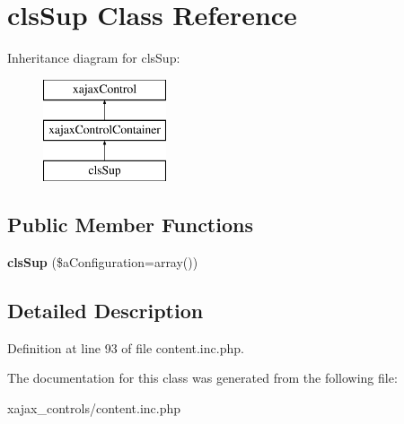 \hypertarget{classclsSup}{
\section{clsSup Class Reference}
\label{classclsSup}
}
Inheritance diagram for clsSup:\begin{figure}[H]
\begin{center}
\leavevmode
\includegraphics[height=3.000000cm]{classclsSup}
\end{center}
\end{figure}
\subsection*{Public Member Functions}
\begin{DoxyCompactItemize}
\item 
\hypertarget{classclsSup_a18a30f5068987cfb1616c72f6e6abb49}{
{\bfseries clsSup} (\$aConfiguration=array())}
\label{classclsSup_a18a30f5068987cfb1616c72f6e6abb49}

\end{DoxyCompactItemize}


\subsection{Detailed Description}


Definition at line 93 of file content.inc.php.



The documentation for this class was generated from the following file:\begin{DoxyCompactItemize}
\item 
xajax\_\-controls/content.inc.php\end{DoxyCompactItemize}
